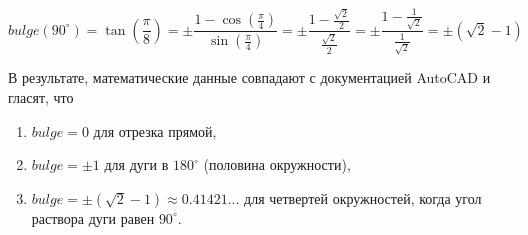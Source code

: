 \begin{equation}
	bulge(90^{\circ})=\tan(\frac{\pi}{8})=\pm\frac{1-\cos(\frac{\pi}{4})}{\sin(\frac{\pi}{4})}=\pm\frac{1-\frac{\sqrt2}{2}}{\frac{\sqrt2}{2}}=\pm\frac{1-\frac{1}{\sqrt2}}{\frac{1}{\sqrt2}}=\pm(\sqrt2-1)
	\label{F:bulge90}
\end{equation}



В результате, математические данные совпадают с документацией AutoCAD \cite{Autodesk} и гласят, что

\begin{enumerate}
	\item $bulge = 0$ для отрезка прямой,
	\item $bulge = \pm1$ для дуги в $180^{\circ}$ (половина окружности),
	\item $bulge = \pm(\sqrt2-1) \approx0.41421...$ для четвертей окружностей, когда угол раствора дуги равен $90^{\circ}$.
\end{enumerate}

